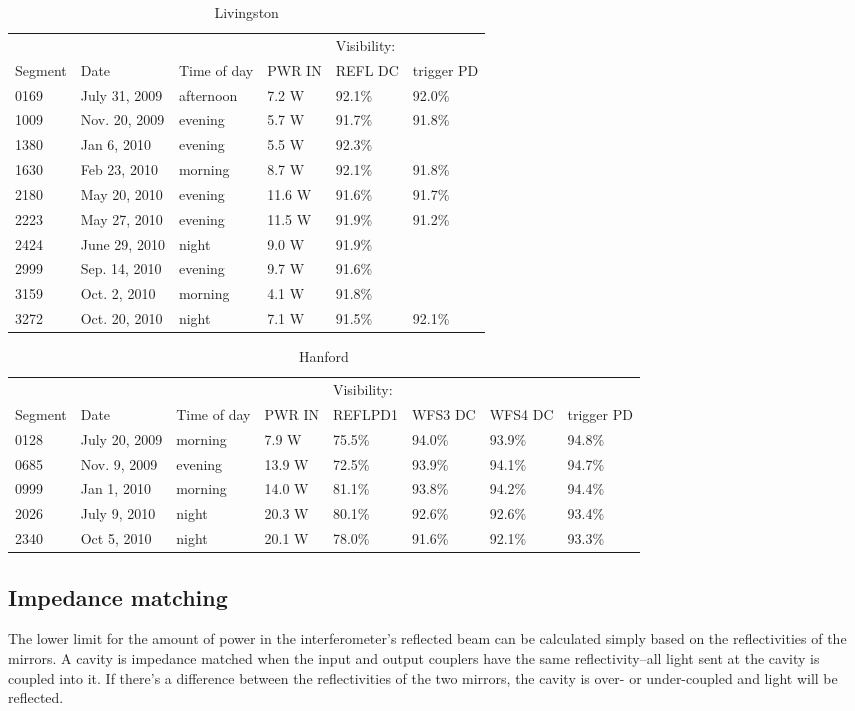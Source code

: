 \begin{table}
\centering
\begin{tabular}{l l l l l l}
 & & & & Visibility: & \\
Segment & Date & Time of day & PWR IN & REFL DC & trigger PD \\
\hline\hline
0169 & July 31, 2009 & afternoon & 7.2 W & 92.1\% & 92.0\% \\
1009 & Nov. 20, 2009 & evening & 5.7 W & 91.7\% & 91.8\% \\
1380 & Jan 6, 2010 & evening & 5.5 W & 92.3\% \\
1630 & Feb 23, 2010 & morning & 8.7 W & 92.1\% & 91.8\% \\
2180 & May 20, 2010 & evening & 11.6 W  & 91.6\% & 91.7\% \\
2223 & May 27, 2010 & evening & 11.5 W  & 91.9\% & 91.2\% \\
2424 & June 29, 2010 & night & 9.0 W & 91.9\% \\
2999 & Sep. 14, 2010 & evening & 9.7 W & 91.6\% \\
3159 & Oct. 2, 2010 & morning & 4.1 W & 91.8\%\\
3272 & Oct. 20, 2010 & night & 7.1 W & 91.5\% & 92.1\% \\
\hline
\end{tabular}
\caption{Livingston}
\label{table:llo_vis}
\end{table}

\begin{table}
\centering
\begin{tabular}{l l l l l l l l}
 & & & & Visibility: & & \\
Segment & Date & Time of day & PWR IN & REFLPD1 & WFS3 DC & WFS4 DC &
trigger PD\\
\hline\hline
0128 & July 20, 2009 & morning & 7.9 W & 75.5\% & 94.0\% & 93.9\% & 94.8\%\\
0685 & Nov. 9, 2009 & evening & 13.9 W & 72.5\% & 93.9\% & 94.1\% & 94.7\%\\
0999 & Jan 1, 2010 & morning & 14.0 W & 81.1\% & 93.8\% & 94.2\% & 94.4\%\\
2026 & July 9, 2010 & night & 20.3 W & 80.1\% & 92.6\% & 92.6\% & 93.4\% \\
2340 & Oct 5, 2010 & night & 20.1 W & 78.0\% & 91.6\% & 92.1\% & 93.3\%\\
\hline
\end{tabular}
\caption{Hanford}
\label{table:lho_mm}
\end{table}


\subsection{Impedance matching}
\label{sec:impedance}
The lower limit for the amount of power in the interferometer's reflected beam 
can be calculated simply based on the reflectivities of the 
mirrors. A cavity is impedance matched when the input and output
couplers have the same reflectivity--all 
light sent at the cavity is coupled into it. If there's a difference between the reflectivities of the two 
mirrors, the cavity is over- or under-coupled and light will be reflected. 


